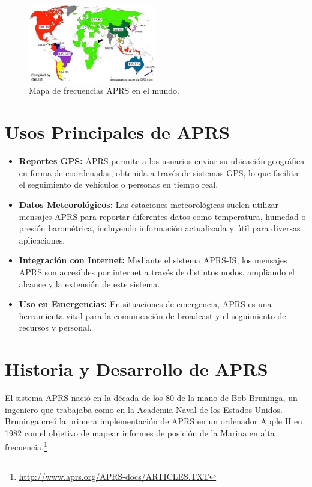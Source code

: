 \begin{figure}
	\centering
	\includegraphics[width=0.5\textwidth]{Imagenes/Chapter_1/mapa_frecuencias_aprs.jpg}
	\caption{Mapa de frecuencias APRS en el mundo.}
	\label{fig:freq-map}
\end{figure}


\section{Usos Principales de APRS}

\begin{itemize}
	\item \textbf{Reportes GPS:} APRS permite a los usuarios enviar su ubicación geográfica en forma de coordenadas, obtenida a través de sistemas GPS, lo que facilita el seguimiento de vehículos o personas en tiempo real.

	\item \textbf{Datos Meteorológicos:} Las estaciones meteorológicas suelen utilizar mensajes APRS para reportar diferentes datos como temperatura, humedad o presión barométrica, incluyendo información actualizada y útil para diversas aplicaciones.

	\item \textbf{Integración con Internet:} Mediante el sistema APRS-IS, los mensajes APRS son accesibles por internet a través de distintos nodos, ampliando el alcance y la extensión de este sistema.

	\item \textbf{Uso en Emergencias:} En situaciones de emergencia, APRS es una herramienta vital para la comunicación de broadcast y el seguimiento de recursos y personal.
\end{itemize}

\section{Historia y Desarrollo de APRS}

El sistema APRS nació en la década de los 80 de la mano de Bob Bruninga, un ingeniero que trabajaba como en la Academia Naval de los Estados Unidos. Bruninga creó la primera implementación de APRS en un ordenador Apple II en 1982 con el objetivo de mapear informes de posición de la Marina en alta frecuencia.\footnote{\url{http://www.aprs.org/APRS-docs/ARTICLES.TXT}} %

